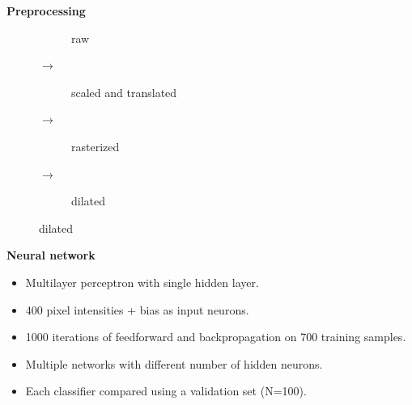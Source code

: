 \documentclass[landscape,paper=160mm:90mm,fontsize=10pt,DIV=16]{scrartcl}
\newenvironment{slide}[1]{\clearpage
    {\LARGE\bfseries#1\par}
}{}
\begin{document}
\begin{slide}{Preprocessing}
    \vspace{1cm}
    \begin{figure}[h]
        \centering
        \begin{subfigure}[t]{0.20\textwidth}
            \resizebox{\textwidth}{!}{}
            \caption{raw}
        \end{subfigure}%
        {$\rightarrow$}
        \begin{subfigure}[t]{0.2\textwidth}
            \resizebox{\textwidth}{!}{}
            \caption{scaled and translated}
        \end{subfigure}
        {$\rightarrow$}
        \begin{subfigure}[t]{0.20\textwidth}
            \hspace*{4mm}
            \vfill
            \caption{rasterized}
        \end{subfigure}%
        {$\rightarrow$}
        \begin{subfigure}[t]{0.20\textwidth}
            \centering
            \hspace*{1mm}
            \vfill
            \caption{dilated}
        \end{subfigure}
    \end{figure}
\end{slide}

\begin{slide}{Neural network}
    \begin{minipage}{0.35\textwidth}
        \begin{itemize}
            \item Multilayer perceptron with single hidden layer.
            \item 400 pixel intensities + bias as input neurons.
            \item 1000 iterations of feedforward and backpropagation on 700
                training samples.
            \item Multiple networks with different number of hidden neurons.
            \item Each classifier compared using a validation set (N=100).
        \end{itemize}
    \end{minipage}
    \begin{minipage}{0.65\textwidth}
        \vspace*{-5mm}
        \centering
        \resizebox*{\textwidth}{!}{}
    \end{minipage}
\end{slide}
\end{document}
